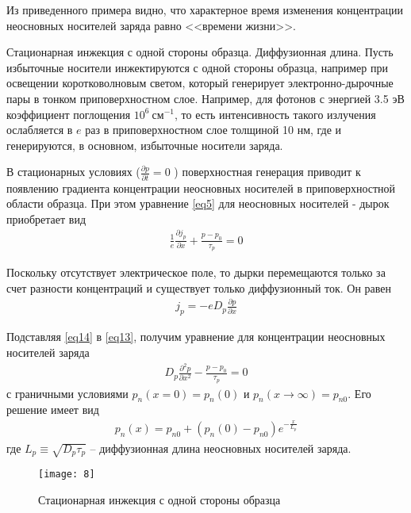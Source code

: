\documentclass[a4paper,12pt]{article}
\begin{document}
Из приведенного примера видно, что характерное время изменения концентрации неосновных носителей заряда равно <<времени жизни>>.

Стационарная инжекция с одной стороны образца. Диффузионная длина. Пусть избыточные носители инжектируются с одной стороны образца, например при освещении коротковолновым светом, который генерирует электронно-дырочные пары в тонком приповерхностном слое. Например, для фотонов с энергией 3.5 эВ коэффициент поглощения $10^6\ \text{см}^{-1}$, то есть интенсивность такого излучения ослабляется в $e$ раз в приповерхностном слое толщиной 10 нм, где и генерируются, в основном, избыточные носители заряда.

В стационарных условиях ($\frac{\partial p}{\partial t}=0$ ) поверхностная генерация приводит к появлению градиента концентрации неосновных носителей в приповерхностной области образца. При этом уравнение \eqref{eq5} для неосновных носителей - дырок приобретает вид
\begin{gather}
	\label{eq13}
	\frac{1}{e} \frac{\partial j_{p}}{\partial x}+\frac{p-p_{0}}{\tau_{p}}=0
\end{gather}

Поскольку отсутствует электрическое поле, то дырки перемещаются только за счет разности концентраций и существует только диффузионный ток. Он равен
\begin{gather}
	\label{eq14}
	j_{p}=-e D_{p} \frac{\partial p}{\partial x}
\end{gather}

Подставляя \eqref{eq14} в \eqref{eq13}, получим уравнение для концентрации
неосновных носителей заряда
\begin{gather}
	\label{eq15}
	D_{p} \frac{\partial^{2} p}{\partial x^{2}}-\frac{p-p_{0}}{\tau_{p}}=0
\end{gather}
с граничными условиями $p_{n}(x=0)=p_{n}(0)$ и $p_{n}(x \rightarrow \infty)=p_{n 0}$. Его решение имеет вид
\begin{gather}
	\label{eq16}
	p_{n}(x)=p_{n 0}+\left(p_{n}(0)-p_{n 0}\right) e^{-\frac{x}{L_{p}}}
\end{gather}
где $L_{p} \equiv \sqrt{D_{p} \tau_{p}}$ -- диффузионная длина неосновных носителей заряда.

\begin{figure}[H]
	\centering
	\texttt{[image: 8]}
	\caption{Стационарная инжекция с одной стороны образца}
	\label{fig:figure7}
\end{figure}
\end{document}
